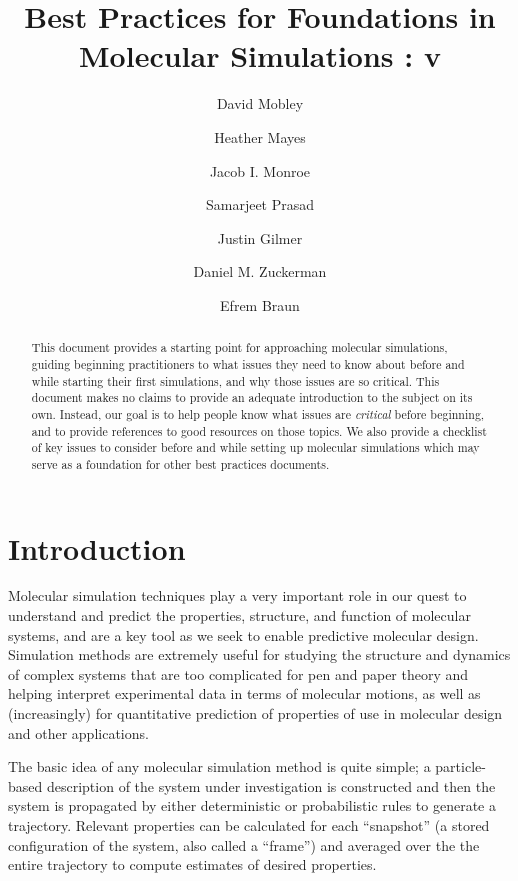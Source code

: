 \documentclass[9pt,bestpractices]{livecoms}
\title{Best Practices for Foundations in Molecular Simulations : v\versionnumber}
\author[1]{David Mobley}
\author[2]{Heather Mayes}
\author[3]{Jacob I. Monroe}
\author[4]{Samarjeet Prasad}
\author[5]{Justin Gilmer}
\author[6]{Daniel M. Zuckerman}
\author[7]{Efrem Braun}
\affil[1]{University of California, Irvine}
\affil[1]{University of Michigan}
\affil[3]{University of California, Santa Barbara}
\affil[4]{National Institutes of Health}
\affil[5]{Vanderbilt University}
\affil[6]{Oregon Health and Science University}
\affil[7]{University of California, Berkeley}
\begin{document}
\begin{frontmatter}
\maketitle

\begin{abstract}
This document provides a starting point for approaching molecular simulations, guiding beginning practitioners to what issues they need to know about before and while starting their first simulations, and why those issues are so critical. 
This document makes no claims to provide an adequate introduction to the subject on its own. 
Instead, our goal is to help people know what issues are \emph{critical} before beginning, and to provide references to good resources on those topics. 
We also provide a checklist of key issues to consider before and while setting up molecular simulations which may serve as a foundation for other best practices documents.
\end{abstract}
\end{frontmatter}


\todototoc
\listoftodos

\section{Introduction}
\label{sec:intro}

Molecular simulation techniques play a very important role in our quest to understand and predict the properties, structure, and function of molecular systems, and are a key tool as we seek to enable predictive molecular design.
Simulation methods are extremely useful for studying the structure and dynamics of complex systems that are too complicated for pen and paper theory and helping interpret experimental data in terms of molecular motions, as well as (increasingly) for quantitative prediction of properties of use in molecular design and other applications.

The basic idea of any molecular simulation method is quite simple; a particle-based description of the system under investigation is constructed and then the system is propagated by either deterministic or probabilistic rules to generate a trajectory. 
Relevant properties can be calculated for each ``snapshot'' (a stored configuration of the system, also called a ``frame'') and averaged over the the entire trajectory to compute estimates of desired properties.
\end{document}
